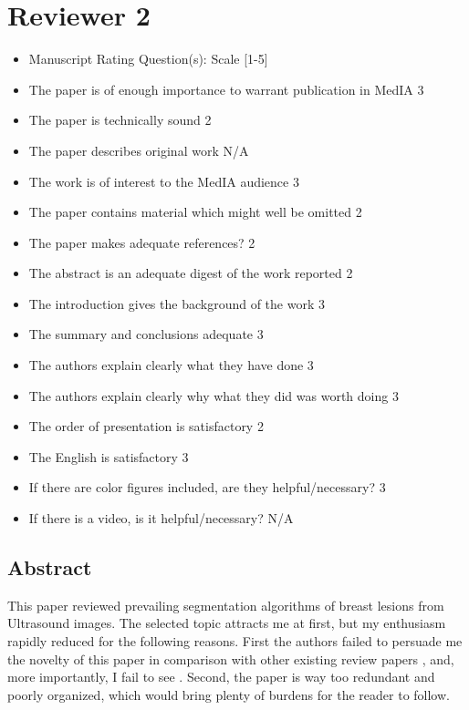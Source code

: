 \documentclass[]{tufte-handout}
\begin{document}
\section{Reviewer 2}
\begin{itemize}[noitemsep,topsep=0pt,parsep=0pt,partopsep=0pt]
\small
\item Manuscript Rating Question(s):  Scale   [1-5]
\item The paper is of enough importance to warrant publication in MedIA  3
\item The paper is technically sound  2
\item The paper describes original work  N/A
\item The work is of interest to the MedIA audience  3
\item The paper contains material which might well be omitted  2
\item The paper makes adequate references?  2
\item The abstract is an adequate digest of the work reported  2
\item The introduction gives the background of the work  3
\item The summary and conclusions adequate  3
\item The authors explain clearly what they have done  3
\item The authors explain clearly why what they did was worth doing  3
\item The order of presentation is satisfactory  2
\item The English is satisfactory  3
\item If there are color figures included, are they helpful/necessary?  3
\item If there is a video, is it helpful/necessary?  N/A
\end{itemize}

\subsection{Abstract}
This paper reviewed prevailing segmentation algorithms of breast lesions from Ultrasound images. The selected topic attracts me at first, but my enthusiasm rapidly reduced for the following reasons. First the authors failed to persuade me the novelty of this paper in comparison with other existing review papers , and, more importantly, I fail to see . Second, the paper is way too redundant and poorly organized, which would bring plenty of burdens for the reader to follow.
\end{document}
